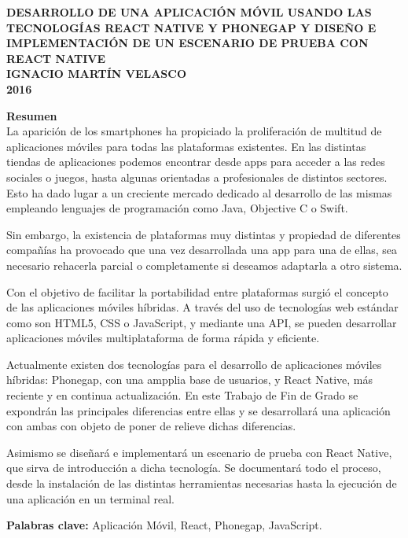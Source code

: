 \documentclass[11pt,a4paper]{report}
\newcommand\blankpage{%
	\null
	\thispagestyle{empty}%
	\newpage}
\begin{document}
\LARGE{\textbf{DESARROLLO DE UNA APLICACIÓN MÓVIL USANDO LAS TECNOLOGÍAS REACT NATIVE Y PHONEGAP Y DISEÑO E IMPLEMENTACIÓN DE UN ESCENARIO DE PRUEBA CON REACT NATIVE}\\[35mm]
\LARGE{\textbf{IGNACIO MARTÍN VELASCO}}\\[5mm]
\LARGE{\textbf{2016}}\\[20mm]
\afterpage{\blankpage}

\clearpage

\newpage
\justifying
\large{\textbf{Resumen}}\\

La aparición de los smartphones ha propiciado la proliferación de multitud de aplicaciones móviles para todas las plataformas existentes. En las distintas tiendas de aplicaciones podemos encontrar desde apps para acceder a las redes sociales o juegos, hasta algunas orientadas a profesionales de distintos sectores. Esto ha dado lugar a un creciente mercado dedicado al desarrollo de las mismas empleando lenguajes de programación como Java, Objective C o Swift. 

Sin embargo, la existencia de plataformas muy distintas y propiedad de diferentes compañías ha provocado que una vez desarrollada una app para una de ellas, sea necesario rehacerla parcial o completamente si deseamos adaptarla a otro sistema. 

Con el objetivo de facilitar la portabilidad entre plataformas surgió el concepto de las aplicaciones móviles híbridas. A través del uso de tecnologías web estándar como son HTML5, CSS o JavaScript, y mediante una API, se pueden desarrollar aplicaciones móviles multiplataforma de forma rápida y eficiente. 

Actualmente existen dos tecnologías para el desarrollo de aplicaciones móviles híbridas: Phonegap, con una ampplia base de usuarios, y React Native, más reciente y en continua actualización. En este Trabajo de Fin de Grado se expondrán las principales diferencias entre ellas y se desarrollará una aplicación con ambas con objeto de poner de relieve dichas diferencias. 

Asimismo se diseñará e implementará un escenario de prueba con React Native, que sirva de introducción a dicha tecnología. Se documentará todo el proceso, desde la instalación de las distintas herramientas necesarias hasta la ejecución de una aplicación en un terminal real.

\vspace{5mm}
\large{\textbf{Palabras clave: } Aplicación Móvil, React, Phonegap, JavaScript.}

}
\end{document}
